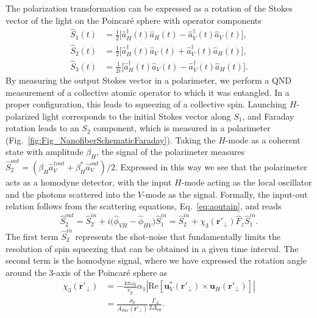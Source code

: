 \documentclass[aps,pra,twocolumn,superscriptaddress]{revtex4-1} %
\newcommand{\nn}{\nonumber}
\newcommand{\mbf}[1]{\mathbf{#1}}
\newcommand{\smallfrac}[2]{\mbox{$\frac{#1}{#2}$}}
\newcommand{\eff}{\text{eff}}
\newcommand{\Poincare}{Poincar\'e\xspace}
\begin{document}
The polarization transformation can be expressed as a rotation of the Stokes vector of the light on the \Poincare sphere with operator components
\begin{subequations}\label{Eq::StokesComponents}
	\begin{align}
		\hat{S}_1(t) & = \smallfrac{1}{2}\big[ \hat{a}^\dag_H(t) \hat{a}_H(t)-\hat{a}^\dag_V(t) \hat{a}_V(t) \big], \\
	 	\hat{S}_2(t) & = \smallfrac{1}{2}\big[ \hat{a}^\dag_H(t) \hat{a}_V(t)+\hat{a}^\dag_V(t) \hat{a}_H(t) \big], \\
		\hat{S}_3(t) & = \smallfrac{1}{2i}\big[ \hat{a}^\dag_H(t) \hat{a}_V(t) -\hat{a}^\dag_V(t) \hat{a}_H(t) \big].
	\end{align}
\end{subequations}
By measuring the output Stokes vector in a polarimeter, we perform a QND measurement of a collective atomic operator to which it was entangled.  In a proper configuration, this leads to squeezing of a collective spin.  Launching $H$-polarized light corresponds to the initial Stokes vector along $S_1$, and Faraday rotation leads to an $S_2$ component, which is measured in a polarimeter (Fig.~\ref{fig:Fig_NanofiberSchematicFaraday}).  Taking the $H$-mode as a coherent state with amplitude $\beta_H$, the signal of the polarimeter measures $\hat{S}_2^{out} = (\beta_H \hat{a}_V^{\dag out} +\beta^*_H \hat{a}_V^{out})/2$.  Expressed in this way we see that the polarimeter acts as a homodyne detector, with the input $H$-mode acting as the local oscillator and the photons scattered into the $V$-mode as the signal.  Formally, the input-out relation follows from the scattering equations, Eq.~\eqref{eq:aoutain}, and reads
\begin{equation}
\hat{S}^{out}_2 = \hat{S}^{in}_2 +i \big( \hat{\phi}_{VH}\!-\! \hat{\phi}_{HV} \big) \hat{S}^{in}_1 =  \hat{S}^{in}_2 \!+\! \chi_3(\mbf{r}'_\perp) \hat{F}_z \hat{S}^{in}_1.
\end{equation}
The first term $\hat{S}^{in}_2$ represents the shot-noise that fundamentally limits the resolution of spin squeezing that can be obtained in a given time interval.  The second term is the homodyne signal, where we have expressed the rotation angle around the 3-axis of the \Poincare sphere as
\begin{align}
\chi_3(\mbf{r}'_\perp) &= -\frac{4 \pi \omega_0}{v_g} \alpha_1 \left\vert \text{Re} \left[ \mbf{u}^*_V (\mbf{r}'_\perp) \times \mbf{u}_H (\mbf{r}'_\perp) \right] \right\vert \nn\\
&= \frac{\sigma_0}{A_{Far}(\mbf{r}'_\perp)} \frac{\Gamma_A}{2 \Delta_{\eff}}.
\end{align}
\end{document}
